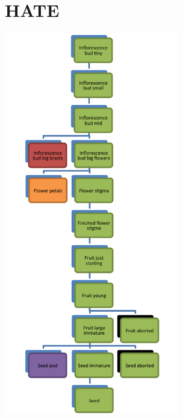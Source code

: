 \documentclass[10pt]{book} %
\begin{document}
\section{HATE}
\begin{multicols}{2}
\includegraphics[width=3in]{images/HATE.png}
\vfill
\columnbreak


\end{multicols}

\clearpage
\newpage
\end{document}
